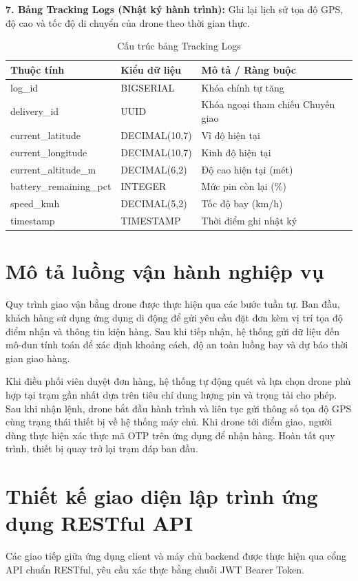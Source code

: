 \noindent\textbf{7. Bảng Tracking Logs (Nhật ký hành trình):} Ghi lại lịch sử tọa độ GPS, độ cao và tốc độ di chuyển của drone theo thời gian thực.
\begin{table}[htbp]
	\centering
	\begin{tabular}{|l|l|l|}
		\hline
		\textbf{Thuộc tính} & \textbf{Kiểu dữ liệu} & \textbf{Mô tả / Ràng buộc} \\ \hline
		log\_id & BIGSERIAL & Khóa chính tự tăng \\ \hline
		delivery\_id & UUID & Khóa ngoại tham chiếu Chuyến giao \\ \hline
		current\_latitude & DECIMAL(10,7) & Vĩ độ hiện tại \\ \hline
		current\_longitude & DECIMAL(10,7) & Kinh độ hiện tại \\ \hline
		current\_altitude\_m & DECIMAL(6,2) & Độ cao hiện tại (mét) \\ \hline
		battery\_remaining\_pct & INTEGER & Mức pin còn lại (\%) \\ \hline
		speed\_kmh & DECIMAL(5,2) & Tốc độ bay (km/h) \\ \hline
		timestamp & TIMESTAMP & Thời điểm ghi nhật ký \\ \hline
	\end{tabular}
	\caption{Cấu trúc bảng Tracking Logs}
\end{table}

\section{Mô tả luồng vận hành nghiệp vụ}
Quy trình giao vận bằng drone được thực hiện qua các bước tuần tự. Ban đầu, khách hàng sử dụng ứng dụng di động để gửi yêu cầu đặt đơn kèm vị trí tọa độ điểm nhận và thông tin kiện hàng. Sau khi tiếp nhận, hệ thống gửi dữ liệu đến mô-đun tính toán để xác định khoảng cách, độ an toàn luồng bay và dự báo thời gian giao hàng.

Khi điều phối viên duyệt đơn hàng, hệ thống tự động quét và lựa chọn drone phù hợp tại trạm gần nhất dựa trên tiêu chí dung lượng pin và trọng tải cho phép. Sau khi nhận lệnh, drone bắt đầu hành trình và liên tục gửi thông số tọa độ GPS cùng trạng thái thiết bị về hệ thống máy chủ. Khi drone tới điểm giao, người dùng thực hiện xác thực mã OTP trên ứng dụng để nhận hàng. Hoàn tất quy trình, thiết bị quay trở lại trạm đáp ban đầu.

\section{Thiết kế giao diện lập trình ứng dụng RESTful API}
Các giao tiếp giữa ứng dụng client và máy chủ backend được thực hiện qua cổng API chuẩn RESTful, yêu cầu xác thực bằng chuỗi JWT Bearer Token.

